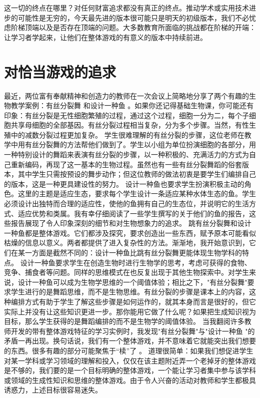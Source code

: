 这一切的终点在哪里？对任何财富追求都没有真正的终点。推动学术或实用技术进步的可能性是无穷的，今天最先进的版本很可能只是明天的初级版本，我们不必忧虑阶梯顶端以及是否存在顶端的问题。大多数教育所面临的挑战都在阶梯的开端：让学习者学起来，让他们在整体游戏的有意义的版本中持续前进。

\section*{对恰当游戏的追求}

最近，两位富有奉献精神和创造力的教师在一次会议上简略地分享了两个有趣的生物教学案例：有丝分裂舞 和设计一种鱼 。如果你还记得基础生物课，你可能还有印象：有丝分裂是无性细胞繁殖的过程，通过这个过程，细胞一分为二，每个子细胞共享母细胞的全部基因。有丝分裂过程相当复杂，分为多个步骤。当然，有性生殖中的减数分裂过程更加复杂。
学生很难理解的有丝分裂的步骤，这位老师在教学中用有丝分裂舞的方法帮他们做到了。学生以小组为单位扮演细胞的各部分，用一种特别设计的舞蹈来表演有丝分裂的步骤，以一种积极的、充满活力的方式为自己重新编码，再现了这一基本的生物过程。虽然也有一些有丝分裂舞蹈的俗套版本，其中学生只需按预设的舞步动作；但这位教师的做法初衷是要学生们编排自己的版本，这是一种更具建设性的努力。
设计一种鱼也要求学生扮演积极主动的角色。这里的主题是适应生态，要求每个学生设计一条适应某种水体生态的鱼。学生必须设计出独特而合理的适应性，使他的鱼拥有自己的生态位，并说明它的生活方式、适应优势和类属。我有幸仔细阅读了一些学生撰写的关于他们的鱼的报告，这些报告展现了令人印象深刻的细节和对生物想象力的追求。
跳有丝分裂舞和设计一种鱼都是整体游戏。它们都涉及探究，要求创造出一些东西，赋予原本可能看似枯燥的信息以意义。两者都提供了进入复杂性的方法。渐渐地，我开始意识到，它们在某一方面是截然不同的：设计一种鱼比跳有丝分裂舞更能体现生物学科的特点。
设计一种鱼要求学生在创造生物时进行生物学的思考，考虑可获得的食物、竞争、捕食者等问题。同样的思维模式在也反复出现于其他生物探索中。对学生来说，设计一种鱼可以成为生物学思维的一个阈值体验；相比之下，"有丝分裂舞"要求学生进行的是舞蹈思维，而不是生物思维。有丝分裂的步骤是课本上的内容，这种编排方式有助于学生了解这些步骤是如何运作的，就其本身而言是很好的，但它实际上并没有让这些知识更进一步。那你能用它做了什么呢？如果把生成知识视为目标，那么学生获得的是舞蹈编排的而不是生物学的阈值体验。
当我翻阅许多教师开发的带有整体游戏特征的学习实例时，我发现"有丝分裂舞"与"设计一种鱼 "的矛盾一再出现。换句话说，我们有一个整体游戏，并不意味着它就能突出我们想要的东西。很多有趣的部分可能聚焦于“椟”了 。
道理很简单：如果我们想促进学生对某一学科或学习领域的理解和投入，仅仅在该主题附近弄一个老掉牙的整体游戏是不够的，我们要的是一个目标明确的整体游戏，一个能让学习者集中参与该学科或领域的生成性知识和思维的整体游戏。由于令人兴奋的活动对教师和学生都极具诱惑力，上述目标很容易迷失。
